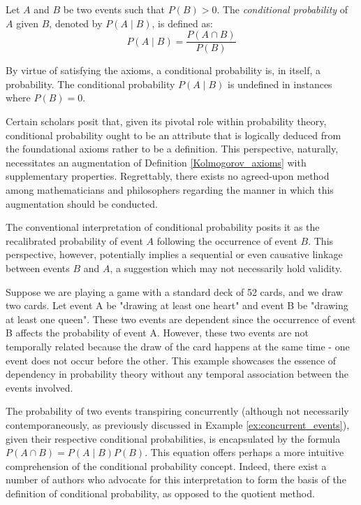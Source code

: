 \begin{definition}
Let $A$ and $B$ be two events such that $P \left( B \right) > 0$. The \emph{conditional probability} of $A$ given $B$, denoted by $P \left( A \mid B \right)$, is defined as:
\[
P\left(A\mid B\right) = \frac{P\left(A\cap B\right)}{P\left(B\right)}
\]
\end{definition}

By virtue of satisfying the axioms, a conditional probability is, in itself, a probability. The conditional probability $P\left(A\mid B\right)$ is undefined in instances where $P\left(B\right)=0$.

Certain scholars posit that, given its pivotal role within probability theory, conditional probability ought to be an attribute that is logically deduced from the foundational axioms rather to be a definition. This perspective, naturally, necessitates an augmentation of Definition \ref{Kolmogorov_axioms} with supplementary properties. Regrettably, there exists no agreed-upon method among mathematicians and philosophers regarding the manner in which this augmentation should be conducted.

The conventional interpretation of conditional probability posits it as the recalibrated probability of event $A$ following the occurrence of event $B$. This perspective, however, potentially implies a sequential or even causative linkage between events $B$ and $A$, a suggestion which may not necessarily hold validity.

\begin{example}
\label{ex:concurrent_events}
Suppose we are playing a game with a standard deck of 52 cards, and we draw two cards. Let event A be "drawing at least one heart" and event B be "drawing at least one queen". These two events are dependent since the occurrence of event B affects the probability of event A. However, these two events are not temporally related because the draw of the card happens at the same time - one event does not occur before the other. This example showcases the essence of dependency in probability theory without any temporal association between the events involved.
\end{example}

The probability of two events transpiring concurrently (although not necessarily contemporaneously, as previously discussed in Example \ref{ex:concurrent_events}), given their respective conditional probabilities, is encapsulated by the formula $P \left( A \cap B \right) = P \left( A \mid B \right) P \left( B \right)$. This equation offers perhaps a more intuitive comprehension of the conditional probability concept. Indeed, there exist a number of authors who advocate for this interpretation to form the basis of the definition of conditional probability, as opposed to the quotient method.

